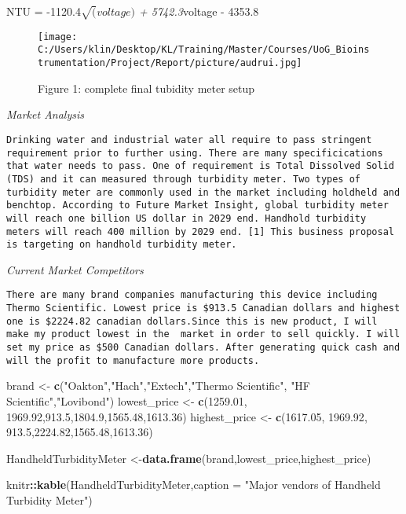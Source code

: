 \documentclass[]{article}
\newenvironment{Shaded}{\begin{snugshade}}{\end{snugshade}}
\newcommand{\KeywordTok}[1]{\textcolor[rgb]{0.13,0.29,0.53}{\textbf{#1}}}
\newcommand{\DataTypeTok}[1]{\textcolor[rgb]{0.13,0.29,0.53}{#1}}
\newcommand{\FloatTok}[1]{\textcolor[rgb]{0.00,0.00,0.81}{#1}}
\newcommand{\StringTok}[1]{\textcolor[rgb]{0.31,0.60,0.02}{#1}}
\newcommand{\OperatorTok}[1]{\textcolor[rgb]{0.81,0.36,0.00}{\textbf{#1}}}
\newcommand{\NormalTok}[1]{#1}
\begin{document}
NTU = -1120.4\emph{\(\sqrt(voltage)\) + 5742.3}voltage - 4353.8

\begin{figure}
\centering
\texttt{[image: C:/Users/klin/Desktop/KL/Training/Master/Courses/UoG\_Bioinstrumentation/Project/Report/picture/audrui.jpg]}
\caption{Figure 1: complete final tubidity meter setup}
\end{figure}

\emph{Market Analysis}

\begin{verbatim}
Drinking water and industrial water all require to pass stringent requirement prior to further using. There are many specificications that water needs to pass. One of requirement is Total Dissolved Solid (TDS) and it can measured through turbidity meter. Two types of turbidity meter are commonly used in the market including holdheld and benchtop. According to Future Market Insight, global turbidity meter will reach one billion US dollar in 2029 end. Handhold turbidity meters will reach 400 million by 2029 end. [1] This business proposal is targeting on handhold turbidity meter.  
\end{verbatim}

\emph{Current Market Competitors}

\begin{verbatim}
There are many brand companies manufacturing this device including Thermo Scientific. Lowest price is $913.5 Canadian dollars and highest one is $2224.82 canadian dollars.Since this is new product, I will make my product lowest in the  market in order to sell quickly. I will set my price as $500 Canadian dollars. After generating quick cash and will the profit to manufacture more products. 
\end{verbatim}

\begin{Shaded}
\begin{Highlighting}[]
\NormalTok{brand <-}\StringTok{ }\KeywordTok{c}\NormalTok{(}\StringTok{"Oakton"}\NormalTok{,}\StringTok{"Hach"}\NormalTok{,}\StringTok{"Extech"}\NormalTok{,}\StringTok{"Thermo Scientific"}\NormalTok{, }\StringTok{"HF Scientific"}\NormalTok{,}\StringTok{"Lovibond"}\NormalTok{)}
\NormalTok{lowest_price <-}\StringTok{ }\KeywordTok{c}\NormalTok{(}\FloatTok{1259.01}\NormalTok{, }\FloatTok{1969.92}\NormalTok{,}\FloatTok{913.5}\NormalTok{,}\FloatTok{1804.9}\NormalTok{,}\FloatTok{1565.48}\NormalTok{,}\FloatTok{1613.36}\NormalTok{)}
\NormalTok{highest_price <-}\StringTok{ }\KeywordTok{c}\NormalTok{(}\FloatTok{1617.05}\NormalTok{, }\FloatTok{1969.92}\NormalTok{,  }\FloatTok{913.5}\NormalTok{,}\FloatTok{2224.82}\NormalTok{,}\FloatTok{1565.48}\NormalTok{,}\FloatTok{1613.36}\NormalTok{)}

\NormalTok{HandheldTurbidityMeter <-}\KeywordTok{data.frame}\NormalTok{(brand,lowest_price,highest_price)}

\NormalTok{knitr}\OperatorTok{::}\KeywordTok{kable}\NormalTok{(HandheldTurbidityMeter,}\DataTypeTok{caption =} \StringTok{"Major vendors of Handheld Turbidity Meter"}\NormalTok{)}
\end{Highlighting}
\end{Shaded}
\end{document}
